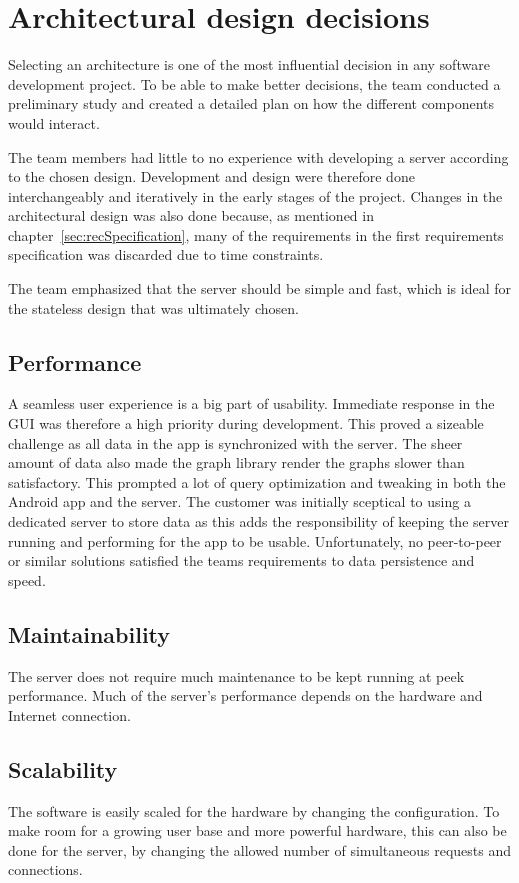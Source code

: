 \section{Architectural design decisions}
Selecting an architecture is one of the most influential decision in any software development project. To be able to make better decisions, the team conducted a preliminary study and created a detailed plan on how the different components would interact. 

The team members had little to no experience with developing a server according to the chosen design. Development and design were therefore done interchangeably and iteratively in the early stages of the project. Changes in the architectural design was also done because, as mentioned in chapter~\ref{sec:recSpecification}, many of the requirements in the first requirements specification was discarded due to time constraints.

The team emphasized that the server should be simple and fast, which is ideal for the stateless design that was ultimately chosen.

\subsection{Performance}
A seamless user experience is a big part of usability. Immediate response in the GUI was therefore a high priority during development. This proved a sizeable challenge as all data in the app is synchronized with the server. 
The sheer amount of data also made the graph library render the graphs slower than satisfactory. This prompted a lot of query optimization and tweaking in both the Android app and the server. 
The customer was initially sceptical to using a dedicated server to store data as this adds the responsibility of keeping the server running and performing for the app to be usable. Unfortunately, no peer-to-peer or similar solutions satisfied the teams requirements to data persistence and speed.

\subsection{Maintainability}
The server does not require much maintenance to be kept running at peek performance. Much of the server's performance depends on the hardware and Internet connection. 

\subsection{Scalability}
The software is easily scaled for the hardware by changing the configuration.  To make room for a growing user base and more powerful hardware, this can also be done for the server, by changing the allowed number of simultaneous requests and connections.


